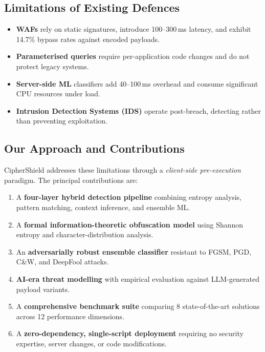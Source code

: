 \documentclass[10pt,twocolumn]{article}
\begin{document}
\subsection{Limitations of Existing Defences}

\begin{itemize}[leftmargin=*,itemsep=1pt,topsep=2pt]
  \item \textbf{WAFs} rely on static signatures, introduce 100--300\,ms
        latency, and exhibit 14.7\% bypass rates against encoded payloads.
  \item \textbf{Parameterised queries} require per-application code changes
        and do not protect legacy systems.
  \item \textbf{Server-side ML} classifiers add 40--100\,ms overhead and
        consume significant CPU resources under load.
  \item \textbf{Intrusion Detection Systems (IDS)} operate post-breach,
        detecting rather than preventing exploitation.
\end{itemize}

\subsection{Our Approach and Contributions}

CipherShield addresses these limitations through a \emph{client-side
pre-execution} paradigm. The principal contributions are:

\begin{enumerate}[leftmargin=*,label=\arabic*.,itemsep=1pt,topsep=2pt]
  \item A \textbf{four-layer hybrid detection pipeline} combining entropy
        analysis, pattern matching, context inference, and ensemble ML.
  \item A \textbf{formal information-theoretic obfuscation model} using
        Shannon entropy and character-distribution analysis.
  \item An \textbf{adversarially robust ensemble classifier} resistant to
        FGSM, PGD, C\&W, and DeepFool attacks.
  \item \textbf{AI-era threat modelling} with empirical evaluation against
        LLM-generated payload variants.
  \item A \textbf{comprehensive benchmark suite} comparing 8 state-of-the-art
        solutions across 12 performance dimensions.
  \item A \textbf{zero-dependency, single-script deployment} requiring no
        security expertise, server changes, or code modifications.
\end{enumerate}
\end{document}
